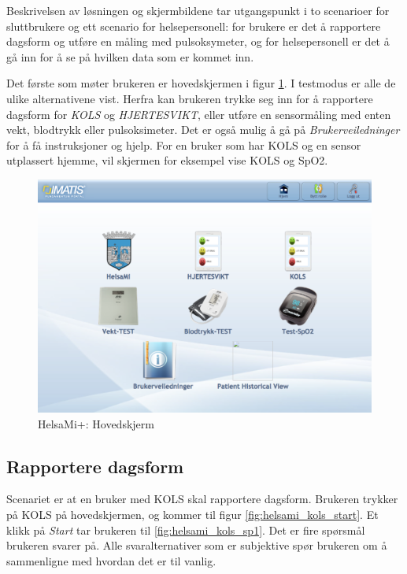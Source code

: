 Beskrivelsen av løsningen og skjermbildene tar utgangspunkt i to scenarioer for sluttbrukere
og ett scenario for helsepersonell: for brukere er det å rapportere dagsform og utføre en måling med pulsoksymeter,
og for helsepersonell er det å gå inn for å se på hvilken data som er kommet inn.

Det første som møter brukeren er hovedskjermen i figur \ref{fig:helsami_hovedskjerm}. I testmodus er alle de ulike
alternativene vist.
Herfra kan brukeren trykke seg inn for å rapportere dagsform for \textit{KOLS} og \textit{HJERTESVIKT}, eller utføre en sensormåling med
enten vekt, blodtrykk eller pulsoksimeter. Det er også mulig å gå på \textit{Brukerveiledninger} for å få instruksjoner og hjelp.
For en bruker som har KOLS og en sensor utplassert hjemme, vil skjermen for eksempel vise KOLS og SpO2.

\begin{figure}
\includegraphics[width=1.0\textwidth,center]{fig/helsami/hovedskjerm}
\caption{HelsaMi+: Hovedskjerm}
\label{fig:helsami_hovedskjerm}
\end{figure}

\subsection{Rapportere dagsform}
Scenariet er at en bruker med KOLS skal rapportere dagsform. Brukeren trykker på KOLS på hovedskjermen,
og kommer til figur \ref{fig:helsami_kols_start}. Et klikk på \textit{Start} tar brukeren til \ref{fig:helsami_kols_sp1}.
Det er fire spørsmål brukeren svarer på. Alle svaralternativer som er subjektive spør brukeren om å sammenligne med
hvordan det er til vanlig.

